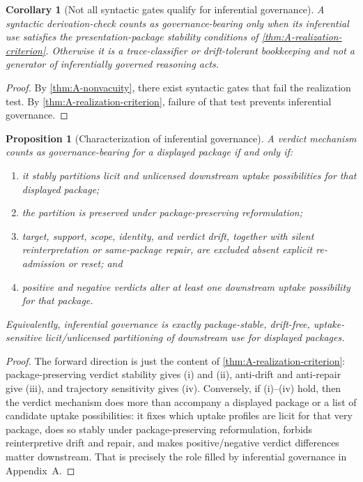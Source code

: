 \documentclass[11pt]{article}
\theoremstyle{plain}
\newtheorem{proposition}[theorem]{Proposition}
\newtheorem{corollary}[theorem]{Corollary}
\theoremstyle{definition}
\begin{document}
\begin{corollary}[Not all syntactic gates qualify for inferential governance]
\label{cor:A-not-all-gates}
A syntactic derivation-check counts as governance-bearing only when its inferential use satisfies the presentation-package stability conditions of \cref{thm:A-realization-criterion}. Otherwise it is a trace-classifier or drift-tolerant bookkeeping and not a generator of inferentially governed reasoning acts.
\end{corollary}

\begin{proof}
By \cref{thm:A-nonvacuity}, there exist syntactic gates that fail the realization test. By \cref{thm:A-realization-criterion}, failure of that test prevents inferential governance.
\end{proof}

\begin{proposition}[Characterization of inferential governance]
\label{prop:A-characterize-governance}
A verdict mechanism counts as governance-bearing for a displayed package if and only if:
\begin{enumerate}[label=(\roman*), leftmargin=2.5em]
    \item it stably partitions licit and unlicensed downstream uptake possibilities for that displayed package;
    \item the partition is preserved under package-preserving reformulation;
    \item target, support, scope, identity, and verdict drift, together with silent reinterpretation or same-package repair, are excluded absent explicit re-admission or reset; and
    \item positive and negative verdicts alter at least one downstream uptake possibility for that package.
\end{enumerate}
Equivalently, inferential governance is exactly package-stable, drift-free, uptake-sensitive licit/unlicensed partitioning of downstream use for displayed packages.
\end{proposition}

\begin{proof}
The forward direction is just the content of \cref{thm:A-realization-criterion}: package-preserving verdict stability gives (i) and (ii), anti-drift and anti-repair give (iii), and trajectory sensitivity gives (iv). Conversely, if (i)--(iv) hold, then the verdict mechanism does more than accompany a displayed package or a list of candidate uptake possibilities: it fixes which uptake profiles are licit for that very package, does so stably under package-preserving reformulation, forbids reinterpretive drift and repair, and makes positive/negative verdict differences matter downstream. That is precisely the role filled by inferential governance in Appendix~A.
\end{proof}
\end{document}
